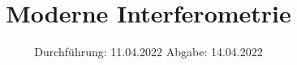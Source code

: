 

\subject{V64}
\title{Moderne Interferometrie}
\date{%
  Durchführung: 11.04.2022
  \hspace{3em}
  Abgabe: 14.04.2022
}



\maketitle
\thispagestyle{empty}
\tableofcontents
\newpage







\printbibliography{}


